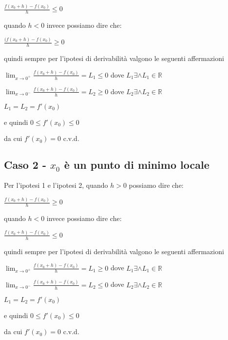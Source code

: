 \documentclass[../dimostrazioni]{subfiles}
\begin{document}
            \( \frac{f(x_0 + h) - f(x_0)}{h}  \leqslant 0\)

            quando \(h<0\) invece possiamo dire che:

            \( \frac{(f(x_0 + h) - f(x_0)}{h}  \geqslant 0\)

            quindi sempre per l'ipotesi di derivabilità valgono le seguenti affermazioni
            
            \(\lim_{x\to 0^+} \frac{f(x_0 + h) - f(x_0)}{h} = L_1 \leqslant 0 \) dove \( L_1 \exists \land L_1 \in \mathbb{R} \)

            \(\lim_{x\to 0^-} \frac{f(x_0 + h) - f(x_0)}{h} = L_2  \geqslant 0 \) dove \( L_2 \exists \land L_2 \in \mathbb{R} \)

            \(L_1 = L_2 = f'(x_0)\)
            
            e quindi
            \(0 \leqslant f'(x_0) \leqslant 0\)
            
            da cui
            \(f'(x_0)=0\) c.v.d.

            \subsection{Caso 2 - \(x_0\) è un punto di minimo locale}

            Per l'ipotesi 1 e l'ipotesi 2, quando \(h>0\) possiamo dire che:
            
            \( \frac{f(x_0 + h) - f(x_0)}{h}  \geqslant 0\)

            quando \(h<0\) invece possiamo dire che:

            \( \frac{f(x_0 + h) - f(x_0)}{h}  \leqslant 0\)

            quindi sempre per l'ipotesi di derivabilità valgono le seguenti affermazioni
            
            \(\lim_{x\to 0^+} \frac{f(x_0 + h) - f(x_0)}{h} = L_1 \geqslant 0 \) dove \( L_1 \exists \land L_1 \in \mathbb{R} \)

            \(\lim_{x\to 0^-} \frac{f(x_0 + h) - f(x_0)}{h} = L_2  \leqslant 0 \) dove \( L_2 \exists \land L_2 \in \mathbb{R} \)

            \(L_1 = L_2 = f'(x_0)\)
            
            e quindi
            \(0 \leqslant f'(x_0) \leqslant 0\)
            
            da cui
            \(f'(x_0)=0\) c.v.d.
\end{document}
